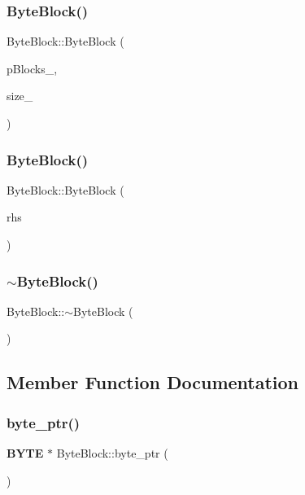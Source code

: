 \subsubsection{Byte\+Block()\hspace{0.1cm}{\footnotesize\ttfamily [2/3]}}
{\footnotesize\ttfamily Byte\+Block\+::\+Byte\+Block (\begin{DoxyParamCaption}\item[{\textbf{ B\+Y\+TE} $\ast$}]{p\+Blocks\+\_\+,  }\item[{size\+\_\+t}]{size\+\_\+ }\end{DoxyParamCaption})}

\mbox{\label{class_byte_block_a1609a4a3919796383a94df4471e02478}} 
\subsubsection{Byte\+Block()\hspace{0.1cm}{\footnotesize\ttfamily [3/3]}}
{\footnotesize\ttfamily Byte\+Block\+::\+Byte\+Block (\begin{DoxyParamCaption}\item[{\textbf{ Byte\+Block} \&\&}]{rhs }\end{DoxyParamCaption})}

\mbox{\label{class_byte_block_ae34629ddad3e2185596f6fb346fb0dd8}} 
\subsubsection{$\sim$\+Byte\+Block()}
{\footnotesize\ttfamily Byte\+Block\+::$\sim$\+Byte\+Block (\begin{DoxyParamCaption}{ }\end{DoxyParamCaption})}



\subsection{Member Function Documentation}
\mbox{\label{class_byte_block_af61ceea6259a82189d1576f16931a9bf}} 
\subsubsection{byte\+\_\+ptr()\hspace{0.1cm}{\footnotesize\ttfamily [1/2]}}
{\footnotesize\ttfamily \textbf{ B\+Y\+TE} $\ast$ Byte\+Block\+::byte\+\_\+ptr (\begin{DoxyParamCaption}{ }\end{DoxyParamCaption})}

